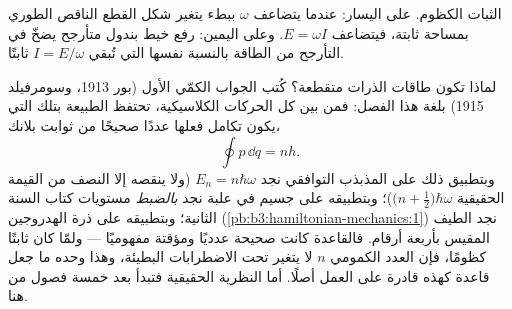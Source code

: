 \begin{omfigure}

{\small الثبات الكظوم. على اليسار: عندما يتضاعف $\omega$ ببطء
يتغير شكل القطع الناقص الطوري بمساحة ثابتة، فيتضاعف
$E = \omega I$. وعلى اليمين: رفع خيط بندول متأرجح يضخّ في
التأرجح من الطاقة بالنسبة نفسها التي تُبقي
$I = E/\omega$ ثابتًا.}
\end{omfigure}

\begin{remark}\label{rem:b3:hamiltonian-mechanics:old-quantum}
لماذا تكون طاقات الذرات متقطعة؟ كُتب الجواب الكمّي الأول (بور
1913، وسومرفيلد 1915) بلغة هذا الفصل: فمن بين كل الحركات
الكلاسيكية، تحتفظ الطبيعة بتلك التي يكون تكامل فعلها عددًا
صحيحًا من ثوابت بلانك،
\[
\oint p\,\dd q = nh .
\]
وبتطبيق ذلك على المذبذب التوافقي نجد $E_n = n\hbar\omega$
(ولا ينقصه إلا النصف من القيمة الحقيقية $\big(n + \tfrac12\big)\hbar
\omega$)؛ وبتطبيقه على جسيم في علبة نجد \emph{بالضبط} مستويات
كتاب السنة الثانية؛ وبتطبيقه على ذرة الهدروجين
(\cref{pb:b3:hamiltonian-mechanics:1}) نجد الطيف المقيس بأربعة
أرقام. فالقاعدة كانت صحيحة عدديًا ومؤقتة مفهوميًا --- ولمّا كان
 ثابتًا كظومًا، فإن العدد الكمومي $n$ لا يتغير تحت
الاضطرابات البطيئة، وهذا وحده ما جعل قاعدة كهذه قادرة على العمل
أصلًا. أما النظرية الحقيقية فتبدأ بعد خمسة فصول من هنا.
\end{remark}

